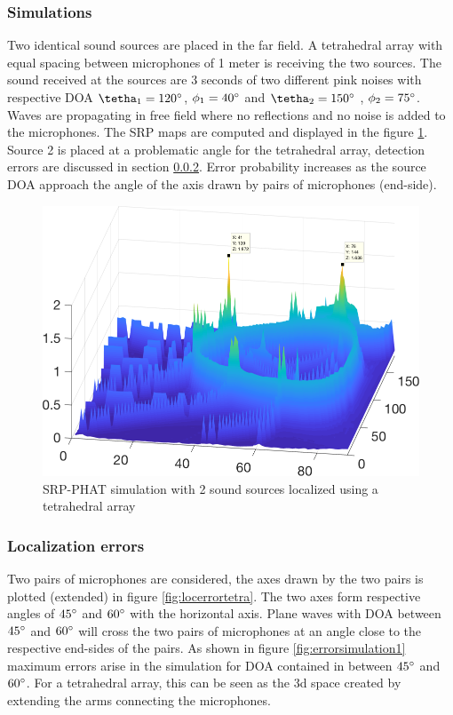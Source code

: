 \subsubsection{Simulations}

Two identical sound sources are placed in the far field. A tetrahedral array with equal spacing between microphones of 1 meter is receiving the two sources. The sound received at the sources are 3 seconds of two different pink noises with respective DOA $\tetha_{1}=120\degree$, $\phi_{1}=40\degree $ and $\tetha_{2}=150\degree $ , $\phi_{2}=75\degree $. Waves are propagating in free field where no reflections and no noise is added to the microphones. The SRP maps are computed and displayed in the figure \ref{fig:coherent2pinknoise}. Source 2 is placed at a problematic angle for the tetrahedral array, detection errors are discussed in section \ref{sec:detection}. Error probability increases as the source DOA approach the angle of the axis drawn by pairs of microphones (end-side).

\begin{figure}[H]
    \centering
    \includegraphics[width=1\textwidth]{Figures/2pinknoisesrpphat.png}
    \caption{SRP-PHAT simulation with 2 sound sources localized using a tetrahedral array}
    \label{fig:coherent2pinknoise}
\end{figure}

\subsubsection{Localization errors} \label{sec:detection}

Two pairs of microphones are considered, the axes drawn by the two pairs is plotted (extended) in figure \ref{fig:locerrortetra}. The two axes form respective angles of $45\degree$ and $60\degree$ with the horizontal axis. Plane waves with DOA between $45\degree$ and $60\degree$ will cross the two pairs of microphones at an angle close to the respective end-sides of the pairs. As shown in figure \ref{fig:errorsimulation1} maximum errors arise in the simulation for DOA contained in between $45\degree$ and $60\degree$. For a tetrahedral array, this can be seen as the 3d space created by extending the arms connecting the microphones. 

